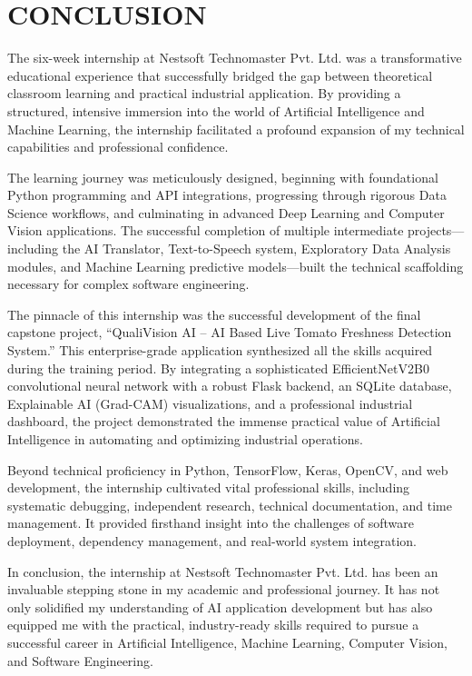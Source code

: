 \chapter{CONCLUSION}

The six-week internship at Nestsoft Technomaster Pvt. Ltd. was a transformative educational experience that successfully bridged the gap between theoretical classroom learning and practical industrial application. By providing a structured, intensive immersion into the world of Artificial Intelligence and Machine Learning, the internship facilitated a profound expansion of my technical capabilities and professional confidence.

The learning journey was meticulously designed, beginning with foundational Python programming and API integrations, progressing through rigorous Data Science workflows, and culminating in advanced Deep Learning and Computer Vision applications. The successful completion of multiple intermediate projects---including the AI Translator, Text-to-Speech system, Exploratory Data Analysis modules, and Machine Learning predictive models---built the technical scaffolding necessary for complex software engineering.

The pinnacle of this internship was the successful development of the final capstone project, ``QualiVision AI – AI Based Live Tomato Freshness Detection System.'' This enterprise-grade application synthesized all the skills acquired during the training period. By integrating a sophisticated EfficientNetV2B0 convolutional neural network with a robust Flask backend, an SQLite database, Explainable AI (Grad-CAM) visualizations, and a professional industrial dashboard, the project demonstrated the immense practical value of Artificial Intelligence in automating and optimizing industrial operations.

Beyond technical proficiency in Python, TensorFlow, Keras, OpenCV, and web development, the internship cultivated vital professional skills, including systematic debugging, independent research, technical documentation, and time management. It provided firsthand insight into the challenges of software deployment, dependency management, and real-world system integration.

In conclusion, the internship at Nestsoft Technomaster Pvt. Ltd. has been an invaluable stepping stone in my academic and professional journey. It has not only solidified my understanding of AI application development but has also equipped me with the practical, industry-ready skills required to pursue a successful career in Artificial Intelligence, Machine Learning, Computer Vision, and Software Engineering.
